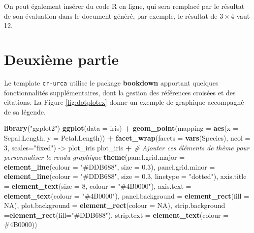 \documentclass[french,]{compterendu}
\newenvironment{Shaded}{\begin{snugshade}}{\end{snugshade}}
\newcommand{\AttributeTok}[1]{\textcolor[rgb]{0.13,0.29,0.53}{#1}}
\newcommand{\CommentTok}[1]{\textcolor[rgb]{0.56,0.35,0.01}{\textit{#1}}}
\newcommand{\ConstantTok}[1]{\textcolor[rgb]{0.56,0.35,0.01}{#1}}
\newcommand{\DecValTok}[1]{\textcolor[rgb]{0.00,0.00,0.81}{#1}}
\newcommand{\FloatTok}[1]{\textcolor[rgb]{0.00,0.00,0.81}{#1}}
\newcommand{\FunctionTok}[1]{\textcolor[rgb]{0.13,0.29,0.53}{\textbf{#1}}}
\newcommand{\NormalTok}[1]{#1}
\newcommand{\OtherTok}[1]{\textcolor[rgb]{0.56,0.35,0.01}{#1}}
\newcommand{\SpecialCharTok}[1]{\textcolor[rgb]{0.81,0.36,0.00}{\textbf{#1}}}
\newcommand{\StringTok}[1]{\textcolor[rgb]{0.31,0.60,0.02}{#1}}
\theoremstyle{urcastyle}
\theoremstyle{remark}
\begin{document}
On peut également insérer du code R en ligne, qui sera remplacé par le résultat de son évaluation dans le document généré, par exemple, le résultat de \(3 \times 4\) vaut 12.

\section{Deuxième partie}\label{deuxiuxe8me-partie}

Le template \texttt{cr-urca} utilise le package \textbf{bookdown} \autocite{pkgbookdown} apportant quelques fonctionnalités supplémentaires, dont la gestion des références croisées et des citations. La Figure \ref{fig:dotplotex} donne un exemple de graphique accompagné de sa légende.






\begin{Shaded}
\begin{Highlighting}[]
\FunctionTok{library}\NormalTok{(}\StringTok{"ggplot2"}\NormalTok{)}
\FunctionTok{ggplot}\NormalTok{(}\AttributeTok{data =}\NormalTok{ iris) }\SpecialCharTok{+}
  \FunctionTok{geom\_point}\NormalTok{(}\AttributeTok{mapping =} \FunctionTok{aes}\NormalTok{(}\AttributeTok{x =}\NormalTok{ Sepal.Length, }\AttributeTok{y =}\NormalTok{ Petal.Length)) }\SpecialCharTok{+}
  \FunctionTok{facet\_wrap}\NormalTok{(}\AttributeTok{facets =} \FunctionTok{vars}\NormalTok{(Species), }\AttributeTok{ncol =} \DecValTok{3}\NormalTok{, }\AttributeTok{scales=}\StringTok{"fixed"}\NormalTok{) }\OtherTok{{-}\textgreater{}}\NormalTok{ plot\_iris}
\NormalTok{plot\_iris }\SpecialCharTok{+} 
  \CommentTok{\# Ajouter ces éléments de thème pour personnaliser le rendu graphique}
  \FunctionTok{theme}\NormalTok{(}\AttributeTok{panel.grid.major =} \FunctionTok{element\_line}\NormalTok{(}\AttributeTok{colour =} \StringTok{"\#DDB688"}\NormalTok{, }\AttributeTok{size =} \FloatTok{0.3}\NormalTok{), }
        \AttributeTok{panel.grid.minor =} \FunctionTok{element\_line}\NormalTok{(}\AttributeTok{colour =} \StringTok{"\#DDB688"}\NormalTok{, }\AttributeTok{size =} \FloatTok{0.3}\NormalTok{, }\AttributeTok{linetype =} \StringTok{"dotted"}\NormalTok{), }
        \AttributeTok{axis.title =} \FunctionTok{element\_text}\NormalTok{(}\AttributeTok{size =} \DecValTok{8}\NormalTok{, }\AttributeTok{colour =} \StringTok{"\#4B0000"}\NormalTok{), }
        \AttributeTok{axis.text =} \FunctionTok{element\_text}\NormalTok{(}\AttributeTok{colour =} \StringTok{"\#4B0000"}\NormalTok{), }
        \AttributeTok{panel.background =} \FunctionTok{element\_rect}\NormalTok{(}\AttributeTok{fill =} \ConstantTok{NA}\NormalTok{), }
        \AttributeTok{plot.background =} \FunctionTok{element\_rect}\NormalTok{(}\AttributeTok{colour =} \ConstantTok{NA}\NormalTok{),}
        \AttributeTok{strip.background =}\FunctionTok{element\_rect}\NormalTok{(}\AttributeTok{fill=}\StringTok{"\#DDB688"}\NormalTok{),}
        \AttributeTok{strip.text =} \FunctionTok{element\_text}\NormalTok{(}\AttributeTok{colour =} \StringTok{\textquotesingle{}\#4B0000\textquotesingle{}}\NormalTok{))}
\end{Highlighting}
\end{Shaded}
\end{document}
